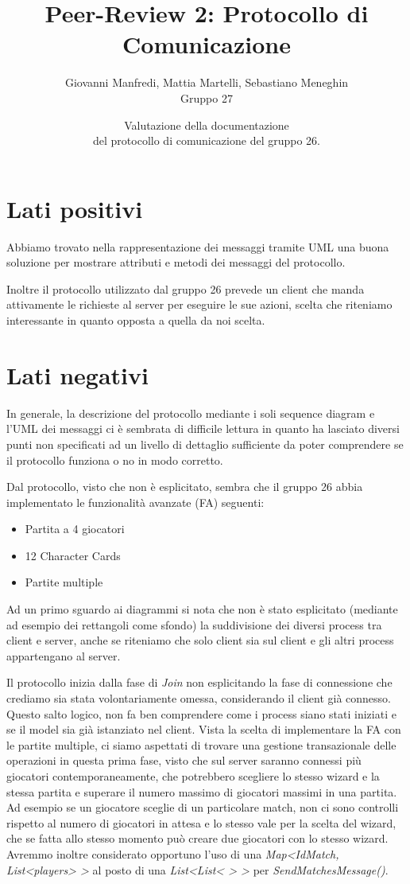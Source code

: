 \documentclass[12pt]{article}
\title{Peer-Review 2: Protocollo di Comunicazione}
\author{Giovanni Manfredi, Mattia Martelli, Sebastiano Meneghin\\Gruppo 27}
\date{Valutazione della documentazione \\del protocollo di comunicazione del gruppo 26.}
\begin{document}
	
	\maketitle
	
	\thispagestyle{empty}
	
	\section*{Lati positivi}
	
	Abbiamo trovato nella rappresentazione dei messaggi tramite UML una buona soluzione per mostrare attributi e metodi dei messaggi del protocollo.
	
	Inoltre il protocollo utilizzato dal gruppo 26 prevede un client che manda attivamente le richieste al server per eseguire le sue azioni, scelta che riteniamo interessante in quanto opposta a quella da noi scelta.
	
	\section*{Lati negativi}
	
	In generale, la descrizione del protocollo mediante i soli sequence diagram e l’UML dei messaggi ci è sembrata di difficile lettura in quanto ha lasciato diversi punti non specificati ad un livello di dettaglio sufficiente da poter comprendere se il protocollo funziona o no in modo corretto.
	
	Dal protocollo, visto che non è esplicitato, sembra che il gruppo 26 abbia implementato le funzionalità avanzate (FA) seguenti:
	\begin{itemize}
		\item Partita a 4 giocatori
		\item 12 Character Cards
		\item Partite multiple
	\end{itemize}
	Ad un primo sguardo ai diagrammi si nota che non è stato esplicitato (mediante ad esempio dei rettangoli come sfondo) la suddivisione dei diversi process tra client e server, anche se riteniamo che solo client sia sul client e gli altri process appartengano al server.
	
	Il protocollo inizia dalla fase di \emph{Join} non esplicitando la fase di connessione che crediamo sia stata volontariamente omessa, considerando il client già connesso. Questo salto logico, non fa ben comprendere come i process siano stati iniziati e se il model sia già istanziato nel client. 
	Vista la scelta di implementare la FA con le partite multiple, ci siamo aspettati di trovare una gestione transazionale delle operazioni in questa prima fase, visto che sul server saranno connessi più giocatori contemporaneamente, che potrebbero scegliere lo stesso wizard e la stessa partita e superare il numero massimo di giocatori massimi in una partita. Ad esempio se un giocatore sceglie di un particolare match, non ci sono controlli rispetto al numero di giocatori in attesa e lo stesso vale per la scelta del wizard, che se fatta allo stesso momento può creare due giocatori con lo stesso wizard.
	Avremmo inoltre considerato opportuno l’uso di una \emph{Map<IdMatch, List<players> >} al posto di una \emph{List<List< > >} per \emph{SendMatchesMessage()}.
	
\end{document}
